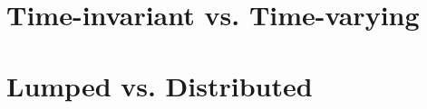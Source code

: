 \documentclass{beamer}
\begin{document}
\section{Time-invariant vs. Time-varying} 

\begin{frame}
\frametitle{}
\end{frame}

\section{Lumped vs. Distributed} 

\begin{frame}
\frametitle{}
\end{frame}

\end{document}
